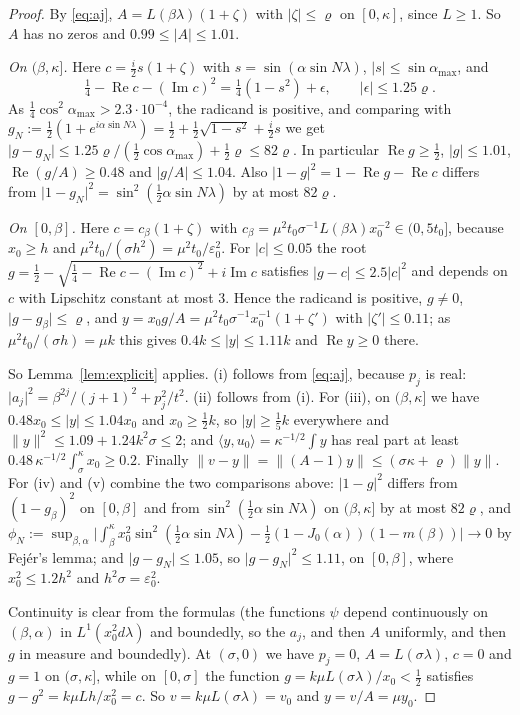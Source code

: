 \documentclass[11pt]{article}
\theoremstyle{definition}
\newcommand{\ip}[2]{\langle #1,#2\rangle}
\newcommand{\norm}[1]{\lVert #1\rVert}
\newcommand{\abs}[1]{\lvert #1\rvert}
\newcommand{\re}{\operatorname{Re}}
\newcommand{\rhoN}{\varrho}
\begin{document}
\begin{proof}
By \eqref{eq:aj}, $A=L(\beta\lambda)(1+\zeta)$ with $\abs\zeta\le\rhoN$ on $[0,\kappa]$, since
$L\ge1$. So $A$ has no zeros and $0.99\le\abs A\le1.01$.

\emph{On $(\beta,\kappa]$.} Here $c=\frac i2s(1+\zeta)$ with $s=\sin(\alpha\sin N\lambda)$,
$\abs s\le\sin\alpha_{\max}$, and
\[
\tfrac14-\re c-(\operatorname{Im}c)^2=\tfrac14(1-s^2)+\epsilon,\qquad\abs\epsilon\le1.25\rhoN .
\]
As $\frac14\cos^2\alpha_{\max}>2.3\cdot10^{-4}$, the radicand is positive, and comparing with
$g_N:=\frac12(1+e^{i\alpha\sin N\lambda})=\frac12+\frac12\sqrt{1-s^2}+\frac i2s$ we get
$\abs{g-g_N}\le1.25\rhoN/(\frac12\cos\alpha_{\max})+\frac12\rhoN\le82\rhoN$. In particular
$\re g\ge\frac12$, $\abs g\le1.01$, $\re(g/A)\ge0.48$ and $\abs{g/A}\le1.04$. Also
$\abs{1-g}^2=1-\re g-\re c$ differs from
$\abs{1-g_N}^2=\sin^2(\frac12\alpha\sin N\lambda)$ by at most $82\rhoN$.

\emph{On $[0,\beta]$.} Here $c=c_\beta(1+\zeta)$ with
$c_\beta=\mu^2t_0\sigma^{-1}L(\beta\lambda)x_0^{-2}\in(0,5t_0]$, because $x_0\ge h$ and
$\mu^2t_0/(\sigma h^2)=\mu^2t_0/\varepsilon_0^2$. For $\abs c\le0.05$ the root
$g=\frac12-\sqrt{\frac14-\re c-(\operatorname{Im}c)^2}+i\operatorname{Im}c$ satisfies
$\abs{g-c}\le2.5\abs c^2$ and depends on $c$ with Lipschitz constant at most $3$. Hence the
radicand is positive, $g\ne0$, $\abs{g-g_\beta}\le\rhoN$, and
$y=x_0g/A=\mu^2t_0\sigma^{-1}x_0^{-1}(1+\zeta')$ with $\abs{\zeta'}\le0.11$; as
$\mu^2t_0/(\sigma h)=\mu k$ this gives $0.4k\le\abs y\le1.11k$ and $\re y\ge0$ there.

So Lemma~\ref{lem:explicit} applies. (i) follows from \eqref{eq:aj}, because $p_j$ is real:
$\abs{a_j}^2=\beta^{2j}/(j+1)^2+p_j^2/t^2$. (ii) follows from (i). For (iii), on
$(\beta,\kappa]$ we have $0.48x_0\le\abs y\le1.04x_0$ and $x_0\ge\frac12k$, so
$\abs y\ge\frac15k$ everywhere and $\norm y^2\le1.09+1.24k^2\sigma\le2$; and
$\ip y{u_0}=\kappa^{-1/2}\int y$ has real part at least
$0.48\,\kappa^{-1/2}\int_\sigma^\kappa x_0\ge0.2$. Finally $\norm{v-y}=\norm{(A-1)y}\le
(\sigma\kappa+\rhoN)\norm y$. For (iv) and (v) combine the two comparisons above:
$\abs{1-g}^2$ differs from $(1-g_\beta)^2$ on $[0,\beta]$ and from
$\sin^2(\frac12\alpha\sin N\lambda)$ on $(\beta,\kappa]$ by at most $82\rhoN$, and
$\phi_N:=\sup_{\beta,\alpha}\bigl|\int_\beta^\kappa x_0^2\sin^2(\frac12\alpha\sin N\lambda)
-\frac12(1-J_0(\alpha))(1-m(\beta))\bigr|\to0$ by Fej\'er's lemma; and
$\abs{g-g_N}\le1.05$, so $\abs{g-g_N}^2\le1.11$, on $[0,\beta]$, where $x_0^2\le1.2h^2$ and $h^2\sigma=\varepsilon_0^2$.

Continuity is clear from the formulas (the functions $\psi$ depend continuously on
$(\beta,\alpha)$ in $L^1(x_0^2d\lambda)$ and boundedly, so the $a_j$, and then $A$ uniformly,
and then $g$ in measure and boundedly). At $(\sigma,0)$ we have $p_j=0$,
$A=L(\sigma\lambda)$, $c=0$ and $g=1$ on $(\sigma,\kappa]$, while on $[0,\sigma]$ the function
$g=k\mu L(\sigma\lambda)/x_0<\frac12$ satisfies $g-g^2=k\mu Lh/x_0^2=c$. So $v=k\mu
L(\sigma\lambda)=v_0$ and $y=v/A=\mu y_0$.
\end{proof}
\end{document}
